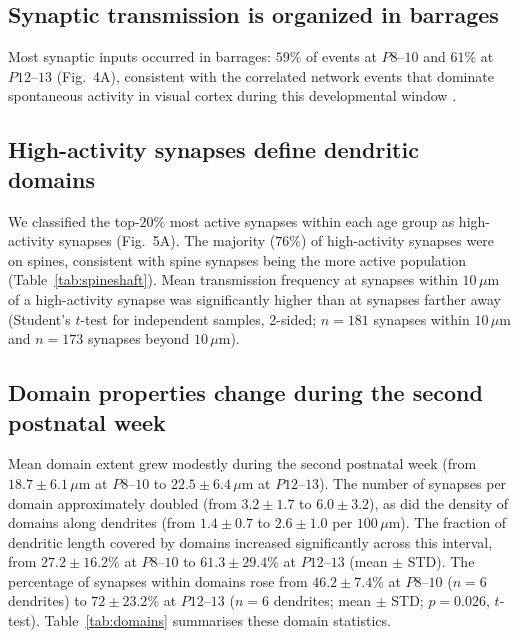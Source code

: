 \documentclass[11pt]{article}
\begin{document}
\subsection{Synaptic transmission is organized in barrages}
Most synaptic inputs occurred in barrages: $59\%$ of events at $P8$--$10$ and $61\%$ at $P12$--$13$ (Fig.~4A), consistent with the correlated network events that dominate spontaneous activity in visual cortex during this developmental window \cite{siegel2012peripheral,allene2008sequential,khazipov2004early,garaschuk2000calcium}.

\subsection{High-activity synapses define dendritic domains}
We classified the top-$20\%$ most active synapses within each age group as high-activity synapses (Fig.~5A). The majority ($76\%$) of high-activity synapses were on spines, consistent with spine synapses being the more active population (Table~\ref{tab:spineshaft}). Mean transmission frequency at synapses within $10\,\mu\mathrm{m}$ of a high-activity synapse was significantly higher than at synapses farther away (Student's $t$-test for independent samples, 2-sided; $n = 181$ synapses within $10\,\mu\mathrm{m}$ and $n = 173$ synapses beyond $10\,\mu\mathrm{m}$).

\subsection{Domain properties change during the second postnatal week}
Mean domain extent grew modestly during the second postnatal week (from $18.7 \pm 6.1\,\mu\mathrm{m}$ at $P8$--$10$ to $22.5 \pm 6.4\,\mu\mathrm{m}$ at $P12$--$13$). The number of synapses per domain approximately doubled (from $3.2 \pm 1.7$ to $6.0 \pm 3.2$), as did the density of domains along dendrites (from $1.4 \pm 0.7$ to $2.6 \pm 1.0$ per $100\,\mu\mathrm{m}$). The fraction of dendritic length covered by domains increased significantly across this interval, from $27.2 \pm 16.2\%$ at $P8$--$10$ to $61.3 \pm 29.4\%$ at $P12$--$13$ (mean $\pm$ STD). The percentage of synapses within domains rose from $46.2 \pm 7.4\%$ at $P8$--$10$ ($n = 6$ dendrites) to $72 \pm 23.2\%$ at $P12$--$13$ ($n = 6$ dendrites; mean $\pm$ STD; $p = 0.026$, $t$-test). Table~\ref{tab:domains} summarises these domain statistics.
\end{document}
